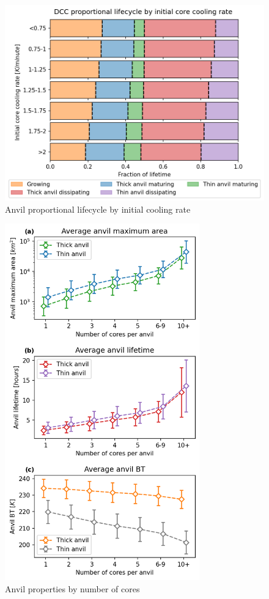 \begin{figure}[tp]
    \centering
    \includegraphics[width=\textwidth]{figures/ch2_23.png}
    \caption{Anvil proportional lifecycle by initial cooling rate}
    \label{fig:anvil_cooling_rate_proportional_lifecycle}
\end{figure}

\begin{figure}[tp]
    \centering
    \includegraphics[width=0.75\textwidth]{figures/ch2_24.png}
    \caption{Anvil properties by number of cores}
    \label{fig:anvil_number_of_cores_propeties}
\end{figure}

